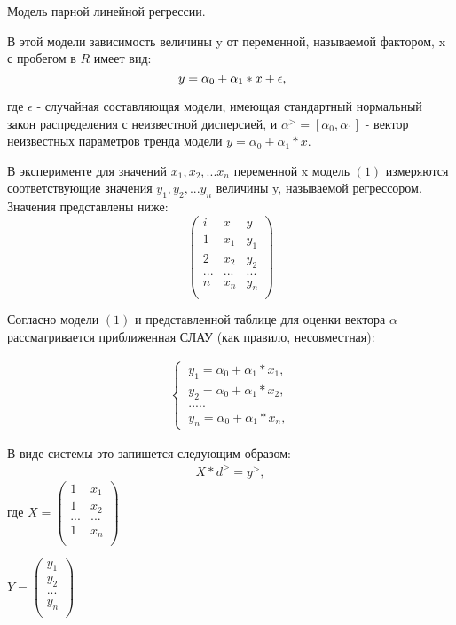 \documentclass[__main__.tex]{subfiles}
\begin{document}
Модель парной линейной регрессии.

В этой модели зависимость величины y от переменной, называемой фактором, x с пробегом в $R$ имеет вид:
\begin{equation}
 \ y = \alpha_0 + \alpha_1 * x + \epsilon,
\llabel{eq:1}
\end{equation}

где $\epsilon$ - случайная составляющая модели, имеющая стандартный нормальный закон распределения с неизвестной дисперсией, и $\alpha^> = [\alpha_0 , \alpha_1 ]$ - вектор неизвестных параметров тренда модели $y = \alpha_0 + \alpha_1 * x$.

В эксперименте для значений $x_1, x_2, ... x_n$ переменной x модель $(1)$ измеряются соответствующие значения $y_1, y_2, ... y_n$ величины y, называемой регрессором. Значения представлены ниже:
 $$
 \left(
 \begin{matrix}
 i & x & y \\
 1 & x_1 & y_1\\
 2 & x_2 & y_2 \\
 ... & ... & ...\\
 n & x_n & y_n \\
 \end{matrix}
 \right)
 $$

Согласно модели $(1)$ и представленной таблице для оценки вектора $\alpha$ рассматривается приближенная СЛАУ (как правило, несовместная):

\begin{gather}
	\begin{cases}
		\ y_1 = \alpha_0 + \alpha_1 * x_1,\\
		\ y_2 = \alpha_0 + \alpha_1 * x_2,\\
		\ ..... \\
		\ y_n = \alpha_0 + \alpha_1 * x_n,
	\end{cases}
\end{gather}
 
В виде системы это запишется следующим образом:
\begin{gather}
	\label{2}
	X*d^{>} = y^{>}, 
\end{gather}
где 
$X = \left(
\begin{matrix}
1 & x_1\\
1 & x_2\\
... & ...\\
1 & x_n\\
\end{matrix}
\right)$ 

$Y = \left(
\begin{matrix}
y_1\\
y_2\\
...\\
y_n\\
\end{matrix}
\right)$ 
\end{document}
